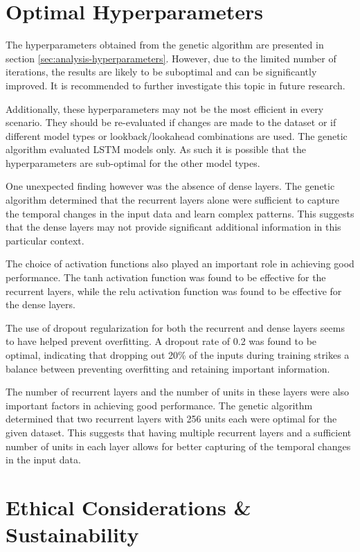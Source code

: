 \section{Optimal Hyperparameters}

The hyperparameters obtained from the genetic algorithm are presented in section \ref{sec:analysis-hyperparameters}. However, due to the limited number of iterations, the results are likely to be suboptimal and can be significantly improved. It is recommended to further investigate this topic in future research.

Additionally, these hyperparameters may not be the most efficient in every scenario. They should be re-evaluated if changes are made to the dataset or if different model types or lookback/lookahead combinations are used. The genetic algorithm evaluated LSTM models only. As such it is possible that the hyperparameters are sub-optimal for the other model types.

One unexpected finding however was the absence of dense layers. The genetic algorithm determined that the recurrent layers alone were sufficient to capture the temporal changes in the input data and learn complex patterns. This suggests that the dense layers may not provide significant additional information in this particular context.

The choice of activation functions also played an important role in achieving good performance. The tanh activation function was found to be effective for the recurrent layers, while the relu activation function was found to be effective for the dense layers.

The use of dropout regularization for both the recurrent and dense layers seems to have helped prevent overfitting. A dropout rate of 0.2 was found to be optimal, indicating that dropping out 20\% of the inputs during training strikes a balance between preventing overfitting and retaining important information.

The number of recurrent layers and the number of units in these layers were also important factors in achieving good performance. The genetic algorithm determined that two recurrent layers with 256 units each were optimal for the given dataset. This suggests that having multiple recurrent layers and a sufficient number of units in each layer allows for better capturing of the temporal changes in the input data.

\section{Ethical Considerations \& Sustainability}

